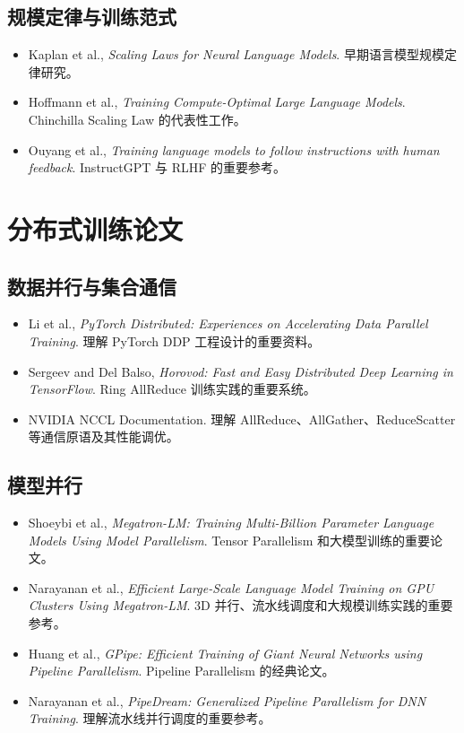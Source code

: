\subsection{规模定律与训练范式}

\begin{itemize}
\item Kaplan et al., \textit{Scaling Laws for Neural Language Models}. 早期语言模型规模定律研究。
\item Hoffmann et al., \textit{Training Compute-Optimal Large Language Models}. Chinchilla Scaling Law 的代表性工作。
\item Ouyang et al., \textit{Training language models to follow instructions with human feedback}. InstructGPT 与 RLHF 的重要参考。
\end{itemize}

\section{分布式训练论文}

\subsection{数据并行与集合通信}

\begin{itemize}
\item Li et al., \textit{PyTorch Distributed: Experiences on Accelerating Data Parallel Training}. 理解 PyTorch DDP 工程设计的重要资料。
\item Sergeev and Del Balso, \textit{Horovod: Fast and Easy Distributed Deep Learning in TensorFlow}. Ring AllReduce 训练实践的重要系统。
\item NVIDIA NCCL Documentation. 理解 AllReduce、AllGather、ReduceScatter 等通信原语及其性能调优。
\end{itemize}

\subsection{模型并行}

\begin{itemize}
\item Shoeybi et al., \textit{Megatron-LM: Training Multi-Billion Parameter Language Models Using Model Parallelism}. Tensor Parallelism 和大模型训练的重要论文。
\item Narayanan et al., \textit{Efficient Large-Scale Language Model Training on GPU Clusters Using Megatron-LM}. 3D 并行、流水线调度和大规模训练实践的重要参考。
\item Huang et al., \textit{GPipe: Efficient Training of Giant Neural Networks using Pipeline Parallelism}. Pipeline Parallelism 的经典论文。
\item Narayanan et al., \textit{PipeDream: Generalized Pipeline Parallelism for DNN Training}. 理解流水线并行调度的重要参考。
\end{itemize}

